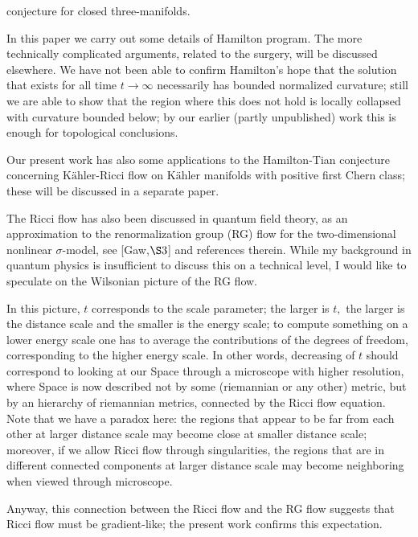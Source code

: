 \documentclass[12pt]{article}
\theoremstyle{plain}
{\swapnumbers
\newtheorem{thm}{Theorem}[section]
\newtheorem{cor}[thm]{Corollary}
\newtheorem{lem}[thm]{Lemma}
\newtheorem{prop}[thm]{Proposition}
}
\theoremstyle{definition}
{\swapnumbers
\newtheorem{defn}[thm]{Definition}
\newtheorem{nota}[thm]{Notation}
\newtheorem{parag}[thm]{}
\newtheorem*{parstr}{\addtocounter{thm}{1}\thesection.\arabic{thm}*}
\newtheorem*{intropar}{\addtocounter{thm}{1}\arabic{thm}}
}
\theoremstyle{remark} {\swapnumbers
\newtheorem{rem}[thm]{Remark}
\newtheorem{exam}[thm]{Example}
\newtheorem{lemma}[thm]{Lemma}
\newtheorem{claim}[thm]{Claim}
}
\numberwithin{equation}{section}
\begin{document}
\begin{intropar}
conjecture for closed three-manifolds. \par In this paper we carry
out some details of Hamilton program. The more technically
complicated arguments, related to the surgery, will be discussed
elsewhere. We have not been able to confirm Hamilton's hope that
the solution that exists for all time $t\to\infty$ necessarily has
bounded normalized curvature; still we are able to show that the
region where this does not hold is locally collapsed with
curvature bounded below; by our earlier (partly unpublished) work
this is enough for topological conclusions.
\par Our present work has also some applications to the
Hamilton-Tian conjecture concerning $\mbox{K\"{a}hler-Ricci}$ flow
on $\mbox{K\"{a}hler}$ manifolds with positive first Chern class;
these will be discussed in a separate paper.
\end{intropar}
\begin{intropar} The Ricci flow has also been discussed in quantum field
theory, as an approximation to the renormalization group (RG) flow
for the two-dimensional nonlinear $\sigma$-model, see [Gaw,$\S 3$]
and references therein. While my background in quantum physics is
insufficient to discuss this on a technical level, I would like to
speculate on the Wilsonian picture of the RG flow. \par In this
picture, $t$ corresponds to the scale parameter; the larger is
$t,$ the larger is the distance scale and the smaller is the
energy scale; to compute something on a lower energy scale one has
to average the contributions of the degrees of freedom,
corresponding to the higher energy scale. In other words,
decreasing of $t$ should correspond to looking at our Space
through a microscope with higher resolution, where Space is now
described not by some (riemannian or any other) metric, but by an
hierarchy of riemannian metrics, connected by the Ricci flow
equation. Note that we have a paradox here: the regions that
appear to be far from each other at larger distance scale may
become close at smaller distance scale; moreover, if we allow
Ricci flow through singularities, the regions that are in
different connected components at larger distance scale may become
neighboring when viewed through microscope.
\par Anyway, this connection between the Ricci flow and the RG
flow suggests that Ricci flow must be gradient-like; the present
work confirms this expectation.
\end{intropar}
\end{document}
